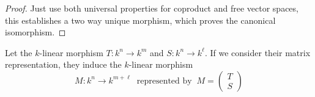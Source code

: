 \begin{proof}
   Just use both universal properties for coproduct and free vector spaces, this
   establishes a two way unique morphism, which proves the canonical
   isomorphism.
\end{proof}

\begin{proposition}
   Let the \(k\)-linear morphism \(T : k^n \to k^m\) and \(S:k^n \to k^\ell\).
   If we consider their matrix representation, they induce the \(k\)-linear
   morphism
   \[
     M : k^n \to k^{m+\ell}\ \text{ represented by }\
     M = \begin{pmatrix} T \\ S \end{pmatrix}
   \]
\end{proposition}

